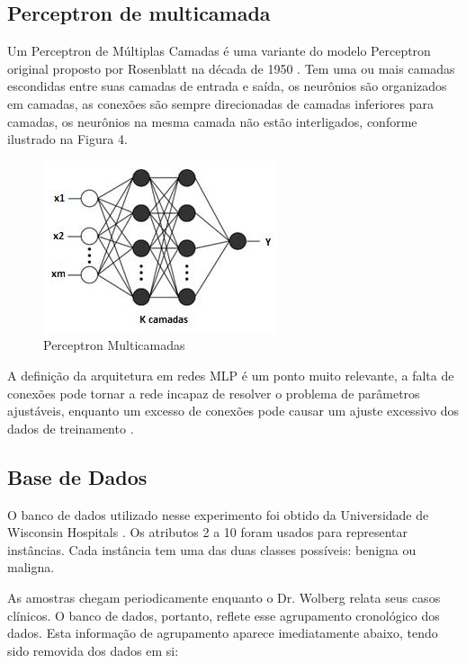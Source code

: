 \documentclass[conference]{IEEEtran}
\begin{document}
    \subsection{Perceptron de multicamada}
    Um Perceptron de Múltiplas Camadas é uma variante do modelo Perceptron original proposto por Rosenblatt na década de 1950 \cite{b9}. Tem uma ou mais camadas escondidas entre suas camadas de entrada e saída, os neurônios são organizados em camadas, as conexões são sempre direcionadas de camadas inferiores para camadas, os neurônios na mesma camada não estão interligados, conforme ilustrado na Figura 4.
    
    \begin{figure}[htbp]
	\centerline{\includegraphics[scale=0.9]{Perceptron-Multicamadas.png}}
	\caption{Perceptron Multicamadas}
	\label{fig}
	\end{figure}
    
    A definição da arquitetura em redes MLP é um ponto muito relevante, a falta de conexões pode tornar a rede incapaz de resolver o problema de parâmetros ajustáveis, enquanto um excesso de conexões pode causar um ajuste excessivo dos dados de treinamento \cite{b7}.

    \subsection{Base de Dados}

O banco de dados utilizado nesse experimento foi obtido da Universidade de Wisconsin Hospitals \cite{b10} \cite{b11}. Os atributos 2 a 10 foram usados para representar instâncias. Cada instância tem uma das duas classes possíveis: benigna ou maligna.
    
    As amostras chegam periodicamente enquanto o Dr. Wolberg relata seus casos clínicos.
   O banco de dados, portanto, reflete esse agrupamento cronológico dos dados.
   Esta informação de agrupamento aparece imediatamente abaixo, tendo sido removida
   dos dados em si:
\end{document}
